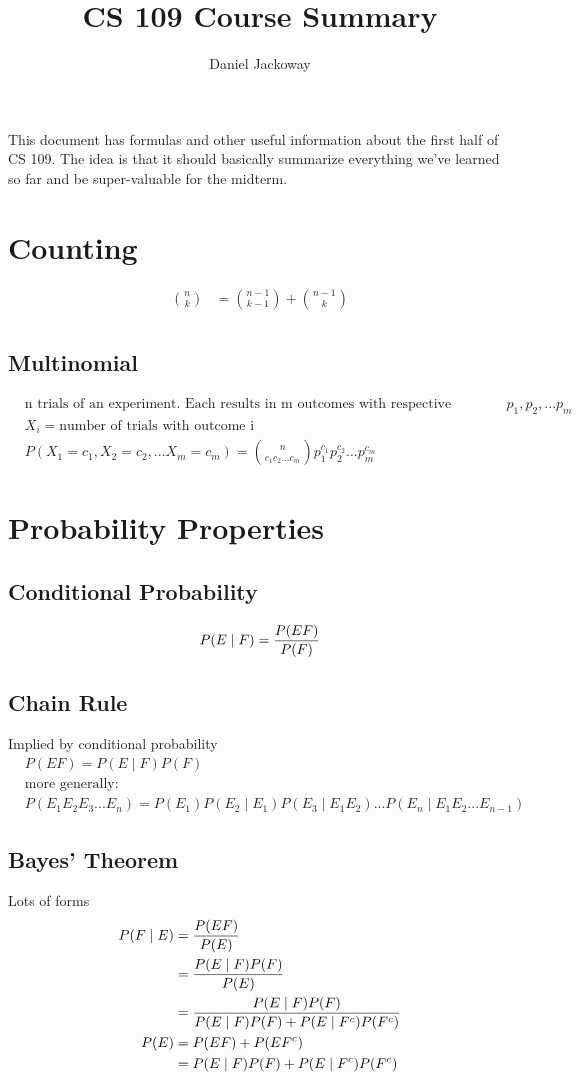 \documentclass[12pt]{amsart}
\title{CS 109 Course Summary}
\author{Daniel Jackoway}
\begin{document}
\maketitle

This document has formulas and other useful information about the first half of CS 109. The idea is that it should basically summarize everything we've learned so far and be super-valuable for the midterm.

\section{Counting}
\begin{align*}
{n \choose k} &= {n-1 \choose k-1} + {n-1 \choose k} \\
\end{align*}

\subsection{Multinomial}
\begin{align*}
&\text{n trials of an experiment. Each results in m outcomes with respective probability } p_1,p_2, ... p_m \\
&X_i = \text{number of trials with outcome i} \\
&P(X_1 = c_1, X_2 = c_2, ... X_m = c_m) = {n \choose c_1 c_2 ... c_m} p_1^{c_1} p_2^{c_2} ... p_m^{c_m}
\end{align*}
\section{Probability Properties}
%
\subsection{Conditional Probability}
\[
P(E \mid F) = {P(EF) \over P(F)}
\]
\subsection{Chain Rule}
Implied by conditional probability
\begin{align*}
&P(EF) = P(E \mid F) P(F) \\
&\text{more generally:} \\
&P(E_1 E_2 E_3 ... E_n) = P(E_1) P(E_2 \mid E_1) P(E_3 \mid E_1 E_2) ... P(E_n \mid E_1 E_2 ... E_{n-1})
\end{align*}
%
\subsection{Bayes' Theorem} Lots of forms
\begin{align*}
P(F \mid E) &= {P(EF) \over P(E)} \\
&= {P(E \mid F) P(F) \over P(E)} \\
&= {P(E \mid F) P(F) \over P(E \mid F) P(F) + P(E \mid F^c) P(F^c)} \\
P(E) &= P(EF) + P(EF^c) \\
&= P(E \mid F) P(F) + P(E \mid F^c) P(F^c)
\end{align*}
\end{document}

